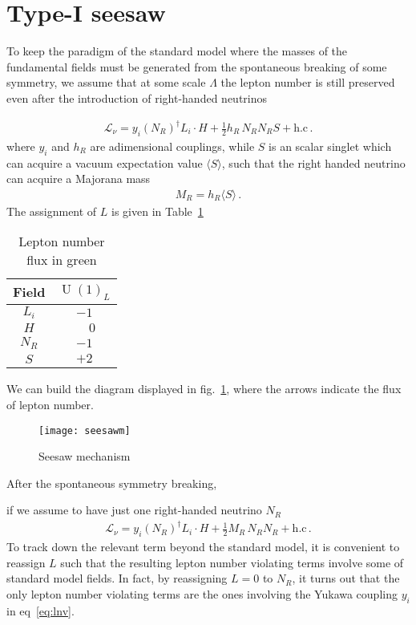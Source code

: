 \section{Type-I seesaw}

To keep the paradigm of the standard model where the masses of the fundamental fields must be generated from the spontaneous breaking of some symmetry, we assume that at some scale $\Lambda$ the lepton number is still preserved even after the introduction of right-handed neutrinos
\begin{frame}
\begin{align}
  \mathcal{L}_{\nu}=y_{i} \left( N_R \right)^{\dagger} L_i\cdot  H   
  +\tfrac{1}{2} h_R\, N_R  N_R S + \text{h.c}\,.
\end{align}
where $y_i$ and $h_R$ are adimensional couplings, while $S$ is an scalar singlet which can acquire a vacuum expectation value $\langle S \rangle$, such that the right handed neutrino can acquire a Majorana mass
\begin{align}
  M_R=h_R \langle S \rangle\,.
\end{align}
The assignment of $L$ is given in Table~\ref{tab:Lassign}
\begin{table}
  \centering
  \begin{tabular}{c|c}
    Field& $\operatorname{U}(1)_L$\\ \hline
    $L_i$& $-1$ \\
    $H$& $\phantom{-}0$ \\
    $N_{R}$& $-1$ \\
    $S$&$+2$
  \end{tabular}
  \caption{Lepton number flux in green }
  \label{tab:Lassign}
\end{table}

We can build the diagram displayed in fig.~\ref{fig:lnv}, where the arrows indicate the flux of lepton number. 

\begin{figure}
  \centering
  \texttt{[image: seesawm]}
  \caption{Seesaw mechanism}
  \label{fig:lnv}
\end{figure}

\end{frame}
After the spontaneous symmetry breaking,
\begin{frame}
if we assume to have just one right-handed neutrino $N_R$ 
\begin{align}
  \label{eq:lnv}
  \mathcal{L}_{\nu}=y_{i} \left( N_R \right)^{\dagger} L_i\cdot  H   
  +\tfrac{1}{2} M_R\, N_R  N_R + \text{h.c}\,.
\end{align}
To track down the relevant term beyond the standard model, it is convenient to reassign $L$ such that the resulting lepton number violating terms involve some of standard model fields. In fact, by reassigning $L=0$ to $N_R$, it turns out that the only lepton number violating terms are the ones involving the Yukawa coupling $y_i$ in eq~\eqref{eq:lnv}.
\end{frame}

